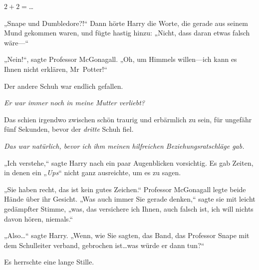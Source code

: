 $2 + 2 = $…

„Snape und Dumbledore?!“
Dann hörte Harry die Worte, die gerade aus seinem Mund gekommen waren, und fügte hastig hinzu: „Nicht, dass daran etwas falsch wäre—“

„Nein!“, sagte Professor McGonagall. „Oh, um Himmels willen—ich kann es Ihnen nicht erklären, Mr~Potter!“

Der andere Schuh war endlich gefallen.

\emph{Er war immer noch in meine Mutter verliebt?}

Das schien irgendwo zwischen schön traurig und erbärmlich zu sein, für ungefähr fünf Sekunden, bevor der \emph{dritte} Schuh fiel.

\emph{Das war natürlich, bevor ich ihm meinen hilfreichen Beziehungsratschläge gab.}

„Ich verstehe,“ sagte Harry nach ein paar Augenblicken vorsichtig. Es gab Zeiten, in denen ein „\emph{Ups}“ nicht ganz ausreichte, um es zu sagen.

„Sie haben recht, das ist kein gutes Zeichen.“ Professor McGonagall legte beide Hände über ihr Gesicht. „Was auch immer Sie gerade denken,“ sagte sie mit leicht gedämpfter Stimme, „was, das versichere ich Ihnen, auch falsch ist, ich will nichts davon hören, niemals.“

„Also…“ sagte Harry. „Wenn, wie Sie sagten, das Band, das Professor Snape mit dem Schulleiter verband, gebrochen ist…was würde er dann tun?“

Es herrschte eine lange Stille.

